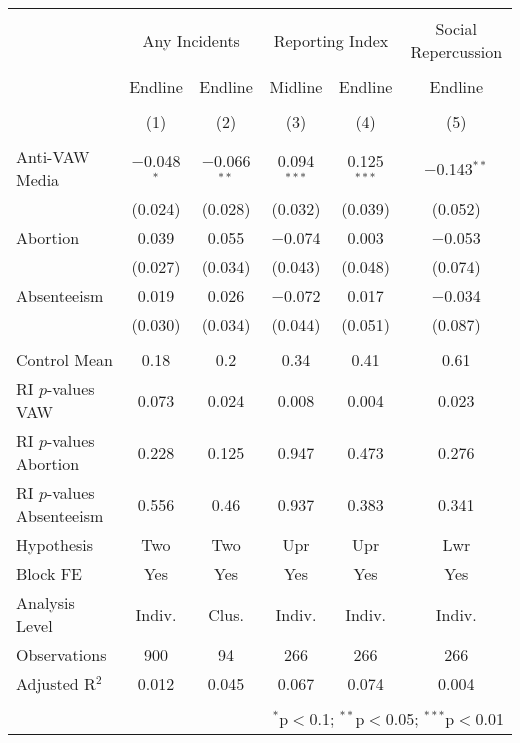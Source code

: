 
\begin{tabular}{@{\extracolsep{5pt}}lccccc} 
\\[-1.8ex]\hline 
\hline \\[-1.8ex] 
 & \multicolumn{2}{c}{Any Incidents} & \multicolumn{2}{c}{Reporting Index} & Social Repercussion \\ 
\\[-1.8ex] & Endline & Endline & Midline & Endline & Endline \\ 
\\[-1.8ex] & (1) & (2) & (3) & (4) & (5)\\ 
\hline \\[-1.8ex] 
 Anti-VAW Media & $-$0.048$^{*}$ & $-$0.066$^{**}$ & 0.094$^{***}$ & 0.125$^{***}$ & $-$0.143$^{**}$ \\ 
  & (0.024) & (0.028) & (0.032) & (0.039) & (0.052) \\ 
  Abortion & 0.039 & 0.055 & $-$0.074 & 0.003 & $-$0.053 \\ 
  & (0.027) & (0.034) & (0.043) & (0.048) & (0.074) \\ 
  Absenteeism & 0.019 & 0.026 & $-$0.072 & 0.017 & $-$0.034 \\ 
  & (0.030) & (0.034) & (0.044) & (0.051) & (0.087) \\ 
 \hline \\[-1.8ex] 
Control Mean & 0.18 & 0.2 & 0.34 & 0.41 & 0.61 \\ 
RI $p$-values VAW & 0.073 & 0.024 & 0.008 & 0.004 & 0.023 \\ 
RI $p$-values Abortion & 0.228 & 0.125 & 0.947 & 0.473 & 0.276 \\ 
RI $p$-values Absenteeism & 0.556 & 0.46 & 0.937 & 0.383 & 0.341 \\ 
Hypothesis & Two & Two & Upr & Upr & Lwr \\ 
Block FE & Yes & Yes & Yes & Yes & Yes \\ 
Analysis Level & Indiv. & Clus. & Indiv. & Indiv. & Indiv. \\ 
Observations & 900 & 94 & 266 & 266 & 266 \\ 
Adjusted R$^{2}$ & 0.012 & 0.045 & 0.067 & 0.074 & 0.004 \\ 
\hline 
\hline \\[-1.8ex] 
\multicolumn{6}{r}{$^{*}$p$<$0.1; $^{**}$p$<$0.05; $^{***}$p$<$0.01} \\ 
\end{tabular} 

